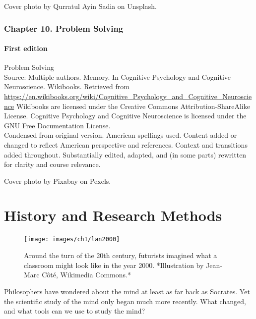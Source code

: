 \documentclass[
]{krantz}
\begin{document}
Cover photo by Qurratul Ayin Sadia on Unsplash.

\hypertarget{chapter-10.-problem-solving}{%
\subsection*{Chapter 10. Problem Solving}\label{chapter-10.-problem-solving}}


\hypertarget{first-edition-10}{%
\subsubsection*{First edition}\label{first-edition-10}}


Problem Solving\\
Source: Multiple authors. Memory. In Cognitive Psychology and Cognitive Neuroscience. Wikibooks. Retrieved from \url{https://en.wikibooks.org/wiki/Cognitive_Psychology_and_Cognitive_Neuroscience}
Wikibooks are licensed under the Creative Commons Attribution-ShareAlike License.
Cognitive Psychology and Cognitive Neuroscience is licensed under the GNU Free Documentation License.\\
Condensed from original version. American spellings used. Content added or changed to reflect American perspective and references. Context and transitions added throughout. Substantially edited, adapted, and (in some parts) rewritten for clarity and course relevance.

Cover photo by Pixabay on Pexels.

\hypertarget{history-and-research-methods}{%
\chapter{History and Research Methods}\label{history-and-research-methods}}

\begin{figure}

{\centering \texttt{[image: images/ch1/lan2000]} 

}

\caption{Around the turn of the 20th century, futurists imagined what a classroom might look like in the year 2000. *Illustration by Jean-Marc Côté, Wikimedia Commons.*}\label{fig:lan2000}
\end{figure}

Philosophers have wondered about the mind at least as far back as Socrates. Yet the scientific study of the mind only began much more recently. What changed, and what tools can we use to study the mind?
\end{document}
